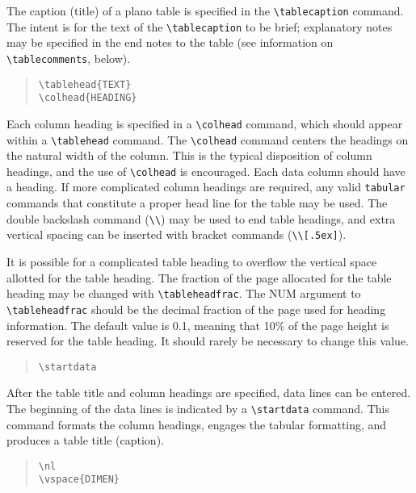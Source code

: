 The caption (title) of a plano table is specified in the 
\verb"\tablecaption" command.  The intent is for the text 
of the \verb"\tablecaption" to be brief; explanatory notes 
may be specified in the end notes to the table (see 
information on \verb"\tablecomments", below).

\begin{quote}
\verb"\tablehead{TEXT}"\\
\verb"\colhead{HEADING}"
\end{quote}

Each column heading is specified in a \verb"\colhead" command, 
which should appear within a \verb"\tablehead" command.  The 
\verb"\colhead" command centers the headings on the natural width 
of the column.  This is the typical disposition of column headings, 
and the use of \verb"\colhead" is encouraged.  Each data column 
should have a heading.  If more complicated column headings are 
required, any valid {\tt tabular} commands that constitute a proper 
head line for the table may be used.  The double backslash command 
(\verb"\\") may be used to end table headings, and extra vertical 
spacing can be inserted with bracket commands (\verb"\\[.5ex]").

It is possible for a complicated table heading to overflow 
the vertical space allotted for the table heading.  The fraction 
of the page allocated for the table heading may be changed with 
\verb"\tableheadfrac".  The {\small NUM} argument to 
\verb"\tableheadfrac" should be the decimal fraction of the page 
used for heading information.  The default value is 0.1, meaning 
that 10\% of the page height is reserved for the table heading.  
It should rarely be necessary to change this value.

\begin{quote}
\verb"\startdata"
\end{quote}

After the table title and column headings are specified, data lines
can be entered.  The beginning of the data lines is indicated by a 
\verb"\startdata" command.  This command formats the column headings, 
engages the tabular formatting, and produces a table title (caption). 

\begin{quote}
\verb"\nl"\\
\verb"\vspace{DIMEN}"
\end{quote}


